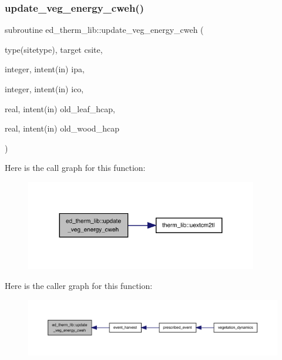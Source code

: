 \subsubsection{\texorpdfstring{update\+\_\+veg\+\_\+energy\+\_\+cweh()}{update\_veg\_energy\_cweh()}}
{\footnotesize\ttfamily subroutine ed\+\_\+therm\+\_\+lib\+::update\+\_\+veg\+\_\+energy\+\_\+cweh (\begin{DoxyParamCaption}\item[{type(sitetype), target}]{csite,  }\item[{integer, intent(in)}]{ipa,  }\item[{integer, intent(in)}]{ico,  }\item[{real, intent(in)}]{old\+\_\+leaf\+\_\+hcap,  }\item[{real, intent(in)}]{old\+\_\+wood\+\_\+hcap }\end{DoxyParamCaption})}

Here is the call graph for this function\+:
\nopagebreak
\begin{figure}[H]
\begin{center}
\leavevmode
\includegraphics[width=287pt]{namespaceed__therm__lib_ae2a805729a52bf5814d2c3a0d84f6fe8_cgraph}
\end{center}
\end{figure}
Here is the caller graph for this function\+:
\nopagebreak
\begin{figure}[H]
\begin{center}
\leavevmode
\includegraphics[width=350pt]{namespaceed__therm__lib_ae2a805729a52bf5814d2c3a0d84f6fe8_icgraph}
\end{center}
\end{figure}
